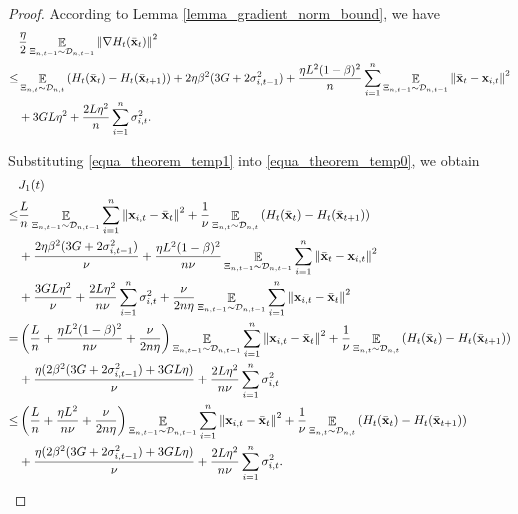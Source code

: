 \documentclass{article}
\begin{document}
\begin{proof}
According to Lemma \ref{lemma_gradient_norm_bound}, we have
\begin{align}
\nonumber
& \frac{\eta}{2}\mathop{\mathbb{E}}_{ \Xi_{n,t-1} \sim \mathcal{D}_{n,t-1} }\left\lVert\nabla H_t(\bar{{\bf x}}_t)\right\rVert^2  \\ \nonumber
\le & \mathop{\mathbb{E}}_{ \Xi_{n,t} \sim \mathcal{D}_{n,t} } \left( H_t(\bar{{\bf x}}_t) - H_t(\bar{{\bf x}}_{t+1}) \right) + 2\eta\beta^2(3G + 2\sigma_{i,t-1}^2) +  \frac{\eta L^2(1-\beta)^2}{n}\sum_{i=1}^n\mathop{\mathbb{E}}_{ \Xi_{n,t-1} \sim \mathcal{D}_{n,t-1} }\left\lVert\bar{{\bf x}}_t - {\bf x}_{i,t} \right\rVert^2 \\ \label{equa_theorem_temp1}  
& + 3GL\eta^2  + \frac{2L\eta^2}{n}\sum_{i=1}^n \sigma_{i,t}^2.
\end{align}

Substituting \eqref{equa_theorem_temp1} into \eqref{equa_theorem_temp0}, we obtain
\begin{align}
\nonumber
& J_1(t) \\ \nonumber 
\le & \frac{L}{n}\mathop{\mathbb{E}}_{ \Xi_{n,t-1} \sim \mathcal{D}_{n,t-1} }\sum_{i=1}^n \left\lVert{\bf x}_{i,t} - \bar{{\bf x}}_t\right\rVert^2 +  \frac{1}{\nu} \mathop{\mathbb{E}}_{ \Xi_{n,t} \sim \mathcal{D}_{n,t} } \left( H_t(\bar{{\bf x}}_t) - H_t(\bar{{\bf x}}_{t+1}) \right) \\ \nonumber 
& + \frac{2\eta\beta^2(3G + 2\sigma_{i,t-1}^2)}{\nu} +  \frac{\eta L^2(1-\beta)^2}{n\nu}\mathop{\mathbb{E}}_{ \Xi_{n,t-1} \sim \mathcal{D}_{n,t-1} }\sum_{i=1}^n\left\lVert\bar{{\bf x}}_t - {\bf x}_{i,t} \right\rVert^2  \\ \nonumber 
&+ \frac{3GL \eta^2}{\nu} + \frac{2L\eta^2}{n\nu} \sum_{i=1}^n \sigma_{i,t}^2  + \frac{\nu}{2n\eta}\mathop{\mathbb{E}}_{ \Xi_{n,t-1} \sim \mathcal{D}_{n,t-1} }\sum_{i=1}^n\left\lVert{\bf x}_{i,t} - \bar{{\bf x}}_t \right\rVert^2  \\ \nonumber
= & \left(  \frac{L}{n} + \frac{\eta L^2(1-\beta)^2}{n\nu} + \frac{\nu}{2n\eta}  \right)\mathop{\mathbb{E}}_{ \Xi_{n,t-1} \sim \mathcal{D}_{n,t-1} }\sum_{i=1}^n\left\lVert{\bf x}_{i,t} - \bar{{\bf x}}_t \right\rVert^2 + \frac{1}{\nu} \mathop{\mathbb{E}}_{ \Xi_{n,t} \sim \mathcal{D}_{n,t} } \left( H_t(\bar{{\bf x}}_t) - H_t(\bar{{\bf x}}_{t+1}) \right) \\ \nonumber 
& + \frac{\eta(2\beta^2(3G + 2\sigma_{i,t-1}^2) + 3GL \eta)}{\nu}  + \frac{2L\eta^2}{n\nu} \sum_{i=1}^n \sigma_{i,t}^2 \\ \nonumber
\le & \left(  \frac{L}{n} + \frac{\eta L^2}{n\nu} + \frac{\nu}{2n\eta}  \right)\mathop{\mathbb{E}}_{ \Xi_{n,t-1} \sim \mathcal{D}_{n,t-1} }\sum_{i=1}^n\left\lVert{\bf x}_{i,t} - \bar{{\bf x}}_t \right\rVert^2 + \frac{1}{\nu} \mathop{\mathbb{E}}_{ \Xi_{n,t} \sim \mathcal{D}_{n,t} } \left( H_t(\bar{{\bf x}}_t) - H_t(\bar{{\bf x}}_{t+1}) \right) \\ \nonumber 
& + \frac{\eta(2\beta^2(3G + 2\sigma_{i,t-1}^2) + 3GL \eta)}{\nu}  + \frac{2L\eta^2}{n\nu} \sum_{i=1}^n \sigma_{i,t}^2.
\end{align}


\end{proof}
\end{document}

